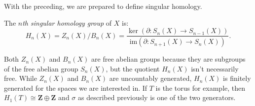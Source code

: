 With the preceding, we are prepared to define singular homology.
\begin{definition}
The \emph{$n$th singular homology group} of $X$ is:
    $$ H_n(X) = Z_n(X)/B_n(X) = \frac{\ker(\partial:S_n(X)\to S_{n-1}(X))}{\mathrm{im}(\partial:S_{n+1}(X)\to S_n(X))}.$$
\end{definition}
Both $Z_n(X)$ and $B_n(X)$ are free abelian groups because they are subgroups of the free abelian group $S_n(X)$, but the quotient $H_n(X)$ isn't necessarily free. While $Z_n(X)$ and $B_n(X)$ are uncountably generated, $H_n(X)$ is finitely generated for the spaces we are interested in. If $T$ is the torus for example, then $H_1(T) \cong \mathbf{Z} \oplus \mathbf{Z}$ and $\sigma$ as described previously is one of the two generators.
